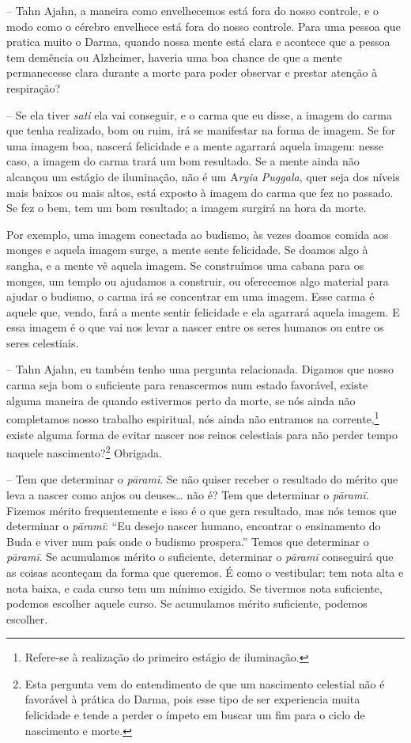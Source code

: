 -- Tahn Ajahn, a maneira como envelhecemos está fora do nosso
controle, e o modo como o cérebro envelhece está fora do nosso
controle. Para uma pessoa que pratica muito o Darma, quando nossa mente
está clara e acontece que a pessoa tem demência ou Alzheimer, haveria
uma boa chance de que a mente permanecesse clara durante a morte para
poder observar e prestar atenção à respiração?

-- Se ela tiver \textit{sati} ela vai conseguir, e o carma que eu
disse, a imagem do carma que tenha realizado, bom ou ruim, irá se
manifestar na forma de imagem. Se for uma imagem boa, nascerá
felicidade e a mente agarrará aquela imagem: nesse caso, a imagem do
carma trará um bom resultado. Se a mente ainda não alcançou um estágio
de iluminação, não é um A\textit{ryia Puggala}, quer seja dos níveis
mais baixos ou mais altos, está exposto à imagem do carma que fez no
passado. Se fez o bem, tem um bom resultado; a imagem surgirá na hora
da morte.

Por exemplo, uma imagem conectada ao budismo, às vezes doamos comida
aos monges e aquela imagem surge, a mente sente felicidade. Se doamos
algo à sangha, e a mente vê aquela imagem. Se construímos uma cabana
para os monges, um templo ou ajudamos a construir, ou oferecemos algo
material para ajudar o budismo, o carma irá se concentrar em uma
imagem. Esse carma é aquele que, vendo, fará a mente sentir felicidade
e ela agarrará aquela imagem. E essa imagem é o que vai nos levar a
nascer entre os seres humanos ou entre os seres celestiais.

-- Tahn Ajahn, eu também tenho uma pergunta relacionada. Digamos
que nosso carma seja bom o suficiente para renascermos num estado
favorável, existe alguma maneira de quando estivermos perto da morte,
se nós ainda não completamos nosso trabalho espiritual, nós ainda não
entramos na corrente,\footnote{Refere-se à realização do primeiro
estágio de iluminação.} existe alguma forma de evitar nascer nos
reinos celestiais para não perder tempo naquele
nascimento?\footnote{Esta pergunta vem do entendimento de que um
nascimento celestial não é favorável à prática do Darma, pois esse tipo
de ser experiencia muita felicidade e tende a perder o ímpeto em buscar
um fim para o ciclo de nascimento e morte.} Obrigada.

-- Tem que determinar o \textit{pāramī}. Se não quiser receber
o resultado do mérito que leva a nascer como anjos ou deuses…
não é? Tem que determinar o \textit{pāramī}. Fizemos mérito
frequentemente e isso é o que gera resultado, mas nós temos que
determinar o \textit{pāramī}: “Eu desejo nascer humano, encontrar
o ensinamento do Buda e viver num país onde o budismo prospera.” Temos
que determinar o \textit{pāramī}. Se acumulamos mérito o
suficiente, determinar o \textit{pāramī} conseguirá que as coisas
aconteçam da forma que queremos. É como o vestibular: tem nota alta e
nota baixa, e cada curso tem um mínimo exigido. Se tivermos nota
suficiente, podemos escolher aquele curso. Se acumulamos mérito
suficiente, podemos escolher.

